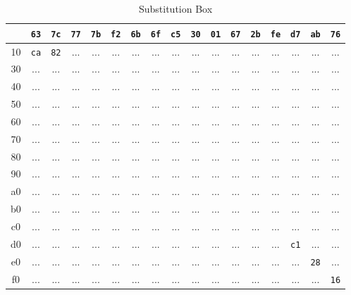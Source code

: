 \begin{longtable}{|c||*{16}{c|}}
	\caption{Substitution Box}\\
	\hline
	\headerrow \endhead %
	\hline\hline
	00 & \texttt{63} & \texttt{7c} & \texttt{77} & \texttt{7b} & \texttt{f2} & \texttt{6b} & \texttt{6f} & \texttt{c5} & \texttt{30} & \texttt{01} & \texttt{67} & \texttt{2b} & \texttt{fe} & \texttt{d7} & \texttt{ab} & \texttt{76} \\
	\hline
	10 & \texttt{ca} & \texttt{82} & ... & ... & ... & ... & ... & ... & ... & ... & ... & ... & ... & ... & ... & ... \\
	\hline
	30 & ... & ... & ... & ... & ... & ... & ... & ... & ... & ... & ... & ... & ... & ... & ... & ... \\
	\hline
	40 & ... & ... & ... & ... & ... & ... & ... & ... & ... & ... & ... & ... & ... & ... & ... & ... \\
	\hline
	50 & ... & ... & ... & ... & ... & ... & ... & ... & ... & ... & ... & ... & ... & ... & ... & ... \\
	\hline
	60 & ... & ... & ... & ... & ... & ... & ... & ... & ... & ... & ... & ... & ... & ... & ... & ... \\
	\hline
	70 & ... & ... & ... & ... & ... & ... & ... & ... & ... & ... & ... & ... & ... & ... & ... & ... \\
	\hline
	80 & ... & ... & ... & ... & ... & ... & ... & ... & ... & ... & ... & ... & ... & ... & ... & ... \\
	\hline
	90 & ... & ... & ... & ... & ... & ... & ... & ... & ... & ... & ... & ... & ... & ... & ... & ... \\
	\hline
	a0 & ... & ... & ... & ... & ... & ... & ... & ... & ... & ... & ... & ... & ... & ... & ... & ... \\
	\hline
	b0 & ... & ... & ... & ... & ... & ... & ... & ... & ... & ... & ... & ... & ... & ... & ... & ... \\
	\hline
	c0 & ... & ... & ... & ... & ... & ... & ... & ... & ... & ... & ... & ... & ... & ... & ... & ... \\
	\hline
	d0 & ... & ... & ... & ... & ... & ... & ... & ... & ... & ... & ... & ... & ... & \texttt{c1} & ... & ... \\
	\hline
	e0 & ... & ... & ... & ... & ... & ... & ... & ... & ... & ... & ... & ... & ... & ... & \texttt{28} & ... \\
	\hline
	f0 & ... & ... & ... & ... & ... & ... & ... & ... & ... & ... & ... & ... & ... & ... & ... & \texttt{16} \\
	\hline
\end{longtable}

